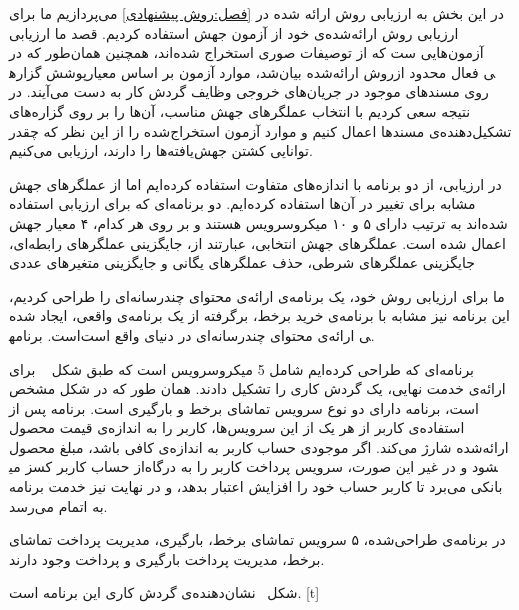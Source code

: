 

در این بخش به ارزیابی روش ارائه شده در 
 \autoref{فصل:روش پیشنهادی}
می‌پردازیم ما برای ارزیابی روش ارائه‌‌شده‌ی خود از آزمون جهش استفاده کردیم. قصد ما ارزیابی آزمون‌هایی ست که از توصیفات صوری استخراج شده‌اند،  همچنین همان‌طور که در روش ارائه‌شده بیان‌شد، موارد آزمون بر اساس معیارپوشش گزاره‎ی فعال محدود از روی مسند‌های موجود در جریان‌های خروجی وظایف گردش کار به دست می‌آیند. در نتیجه سعی کردیم با انتخاب عملگر‌های جهش مناسب، آن‌ها را بر روی گزاره‌های تشکیل‌دهنده‌ی مسند‌ها اعمال کنیم و موارد آزمون استخراج‌شده را از این نظر که چقدر توانایی کشتن جهش‌یافته‌ها را دارند، ارزیابی می‌کنیم.

در ارزیابی، از دو برنامه با اندازه‌های متفاوت استفاده کرده‌ایم اما از عملگر‌های جهش مشابه برای تغییر در آن‌ها استفاده کرده‌ایم. 
دو برنامه‌ای که برای ارزیابی استفاده شده‌اند به ترتیب دارای ۵ و ۱۰ میکروسرویس هستند و بر روی هر کدام، ۴ معیار جهش اعمال شده‌ است. عملگرهای جهش انتخابی، عبارتند از، جایگزینی عملگرهای رابطه‌ای، جایگزینی عملگرهای شرطی، حذف عملگرهای یگانی و جایگزینی متغیرهای عددی 


ما برای ارزیابی روش خود، یک برنامه‌ی ارائه‌ی محتوای چندرسانه‌ای را طراحی کردیم، این برنامه نیز مشابه با برنامه‌ی خرید برخط، برگرفته از یک برنامه‌ی واقعی، ایجاد شده است. برنامه‎ی ارائه‌ی محتوای چندرسانه‌ای در دنیای واقع است. 

برنامه‌ای که طراحی کرده‌ایم شامل 5 میکروسرویس است که طبق شکل ~ برای ارائه‌ی خدمت نهایی، یک گردش کاری را تشکیل دادند. همان طور که در شکل مشخص است، برنامه دارای دو نوع سرویس تماشای برخط و بارگیری است. برنامه پس از استفاده‌ی کاربر از هر یک از این سرویس‌ها، کاربر را به اندازه‌ی قیمت محصول ارائه‌شده شارژ می‌کند. اگر موجودی حساب کاربر به اندازه‌ی کافی باشد، مبلغ محصول از حساب کاربر کسز می‎شود و در غیر این صورت، سرویس پرداخت کاربر را به درگاه بانکی می‌برد تا کاربر حساب خود را افزایش اعتبار بدهد، و در نهایت نیز خدمت برنامه به اتمام می‌رسد. 

در برنامه‌ی طراحی‌شده، ۵ سرویس تماشای برخط، بارگیری، مدیریت پرداخت تماشای برخط، مدیریت پرداخت بارگیری و پرداخت وجود دارند.

شکل~ نشان‌دهنده‌ی گردش کاری این برنامه است.
[t]
\vspace{0.5em}

